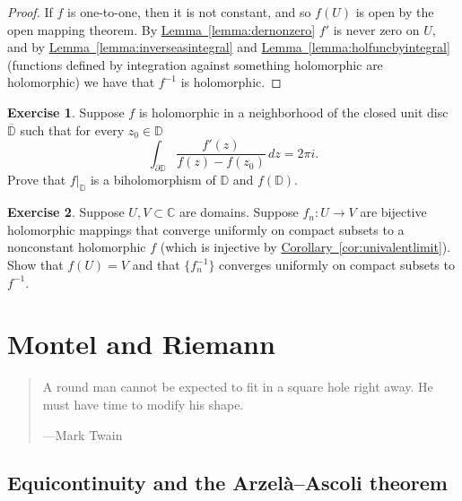 \documentclass[12pt,openany]{book}
\newcommand{\C}{{\mathbb{C}}}
\newcommand{\D}{{\mathbb{D}}}
\theoremstyle{plain}
\theoremstyle{remark}
\theoremstyle{definition}
\newenvironment{exbox}{%
    \def\FrameCommand{\vrule width 1pt \relax\hspace{10pt}}%
    \MakeFramed{\advance\hsize-\width\FrameRestore}%
}{%
    \endMakeFramed
}
\newenvironment{myquote}{%
    \begin{quote}%
    \begingroup\itshape
}{%
    \endgroup%
    \end{quote}
}
\theoremstyle{exercise}
\newtheorem{exercise}{Exercise}[section]
\theoremstyle{example}
\newcommand{\lemmaref}[1]{\hyperref[#1]{Lemma~\ref*{#1}}}
\newcommand{\corref}[1]{\hyperref[#1]{Corollary~\ref*{#1}}}
\begin{document}
\begin{proof}
If $f$ is one-to-one, then it is not constant, and so $f(U)$ is open by
the open mapping theorem.  By \lemmaref{lemma:dernonzero} $f'$ is never zero
on $U$, and by \lemmaref{lemma:inverseasintegral} and
\lemmaref{lemma:holfuncbyintegral} (functions defined by integration against
something holomorphic are holomorphic)
we have that $f^{-1}$ is holomorphic.
\end{proof}

\begin{exbox}
\begin{exercise}
Suppose $f$ is holomorphic in a neighborhood of the closed unit disc
$\overline{\D}$ such that for every $z_0 \in \D$
\begin{equation*}
\int_{\partial \D}
\frac{f'(z)}{f(z)-f(z_0)}
\, dz = 2\pi i .
\end{equation*}
Prove that $f|_{\D}$ is a biholomorphism of $\D$ and $f(\D)$.
\end{exercise}

\begin{exercise}
Suppose $U,V \subset \C$ are domains.
Suppose $f_n \colon U \to V$ are bijective holomorphic mappings
that converge uniformly on compact subsets to a nonconstant
holomorphic $f$ (which is injective by \corref{cor:univalentlimit}).
Show that $f(U) = V$ and that $\bigl\{ f_n^{-1} \bigr\}$ converges uniformly on
compact subsets to $f^{-1}$.
\end{exercise}
\end{exbox}



\chapter{Montel and Riemann} \label{ch:montelriemann}

\begin{myquote}
A round man cannot be expected to fit in a square hole right away. He must
have time to modify his shape.

---Mark Twain
\end{myquote}


\section{Equicontinuity and the Arzel\`a--Ascoli theorem}
\label{sec:arzelaascoli}
\end{document}
